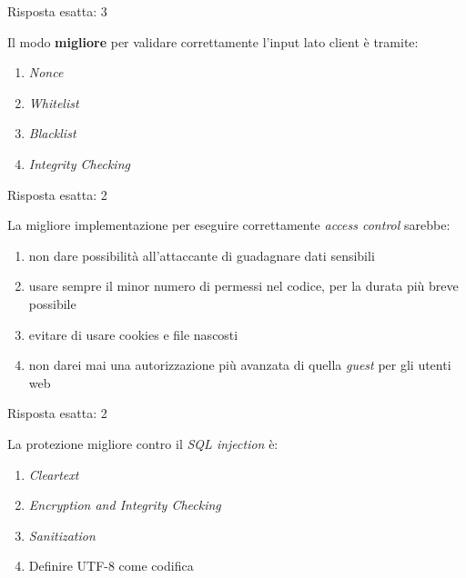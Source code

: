 \begin{Answer} [
  ref={esControlli4},
  number={4}
  ]

  \Question Risposta esatta: 3
\end{Answer}

\begin{Exercise} [
  title={Quiz},
  label={esControlli5}
  ]

  \Question Il modo \textbf{migliore} per validare correttamente l'input lato
client è tramite:
  \begin{enumerate}
\item \textit{Nonce}
\item \textit{Whitelist}
\item \textit{Blacklist}
\item \textit{Integrity Checking}
\end{enumerate}


\end{Exercise}

\begin{Answer} [
  ref={esControlli5},
  number={5}
  ]

  \Question Risposta esatta: 2
\end{Answer}


\begin{Exercise} [
  title={Quiz},
  label={esControlli6}
  ]

  \Question La migliore implementazione per eseguire correttamente
\textit{access control} sarebbe:
\begin{enumerate}
 \item non dare possibilità all'attaccante di guadagnare dati sensibili
 \item usare sempre il minor numero di permessi nel codice, per la durata più
breve possibile
 \item evitare di usare cookies e file nascosti
 \item non darei mai una autorizzazione più avanzata di quella \textit{guest}
per gli utenti web
\end{enumerate}

\end{Exercise}

\begin{Answer} [
  ref={esControlli6},
  number={6}
  ]

  \Question Risposta esatta: 2
\end{Answer}


\begin{Exercise} [
  title={Quiz},
  label={esControlli7}
  ]

  \Question La protezione migliore contro il \textit{SQL injection} è:
  \begin{enumerate}
    \item \textit{Cleartext}
    \item \textit{Encryption and Integrity Checking}
    \item \textit{Sanitization}
    \item Definire UTF-8 come codifica
  \end{enumerate}
\end{Exercise}

